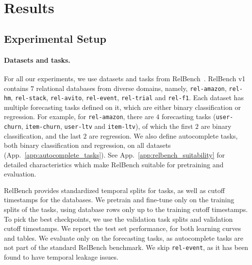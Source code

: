 \section{Results}
\label{sec:experiments}

\subsection{Experimental Setup}

\paragraph{Datasets and tasks.}
For all our experiments,
we use datasets and tasks from RelBench~\citep{relbench,gu2026relbenchv2}.
RelBench v1 contains $7$ relational databases from diverse domains, namely,
\texttt{rel-amazon}, \texttt{rel-hm}, \texttt{rel-stack},
\texttt{rel-avito}, \texttt{rel-event}, \texttt{rel-trial} and \texttt{rel-f1}.
Each dataset has multiple forecasting tasks defined on it,
which are either binary classification or regression.
For example, for \texttt{rel-amazon},
there are $4$ forecasting tasks
(\texttt{user-churn}, \texttt{item-churn}, \texttt{user-ltv} and \texttt{item-ltv}),
of which the first $2$ are binary classification,
and the last $2$ are regression.
We also define autocomplete tasks,
both binary classification and regression,
on all datasets
(App.~\ref{app:autocomplete_tasks}).
See App.~\ref{app:relbench_suitability} for detailed characteristics
which make RelBench suitable for pretraining and evaluation.

RelBench provides standardized temporal splits for tasks,
as well as cutoff timestamps for the databases.
We pretrain and fine-tune only on the training splits of the tasks,
using database rows only up to the training cutoff timestamps.
To pick the best checkpoints,
we use the validation task splits and
validation cutoff timestamps.
We report the test set performance,
for both learning curves and tables.
We evaluate only on the forecasting tasks,
as autocomplete tasks are not part of the standard RelBench benchmark.
We skip \texttt{rel-event},
as it has been found to have temporal leakage issues.

